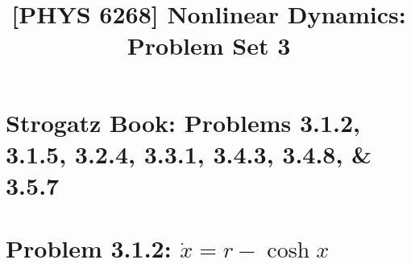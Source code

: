 \documentclass[draft]{agujournal2019}
\begin{document}
\SetSinglespace{}
\title{[PHYS 6268] Nonlinear Dynamics: Problem Set 3}




\section*{Strogatz Book: Problems 3.1.2, 3.1.5, 3.2.4, 3.3.1, 3.4.3, 3.4.8, \& 3.5.7}







\section{Problem 3.1.2: $\dot x = r - \cosh{x}$}
\label{sec:p1}
\end{document}
